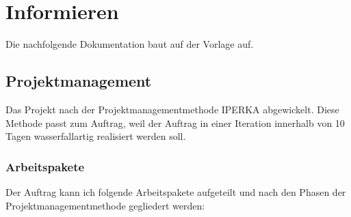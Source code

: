 \chapter{Informieren}

Die nachfolgende Dokumentation baut auf der Vorlage \cite{Buhler_ipa-template_2022} auf.

\section{Projektmanagement}

Das Projekt nach der Projektmanagementmethode IPERKA abgewickelt. Diese Methode passt zum Auftrag, weil der Auftrag in einer Iteration innerhalb von 10 Tagen wasserfallartig realisiert werden soll.

\subsection{Arbeitspakete}

Der Auftrag kann ich folgende Arbeitspakete aufgeteilt und nach den Phasen der Projektmanagementmethode gegliedert werden:

